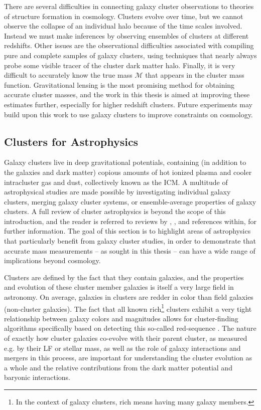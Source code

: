 There are several difficulties in connecting galaxy cluster observations to theories of structure formation in cosmology. Clusters evolve over time, but we cannot observe the collapse of an individual halo because of the time scales involved. Instead we must make inferences by observing ensembles of clusters at different redshifts. Other issues are the observational difficulties associated with compiling pure and complete samples of galaxy clusters, using techniques that nearly always probe some visible tracer of the cluster dark matter halo. Finally, it is very difficult to accurately know the true mass ${\mathscr M}$ that appears in the cluster mass function. Gravitational lensing is the most promising method for obtaining accurate cluster masses, and the work in this thesis is aimed at improving these estimates further, especially for higher redshift clusters. Future experiments may build upon this work to use galaxy clusters to improve constraints on cosmology.


\subsection{Clusters for Astrophysics}
\label{sec:ClusterAstro}

Galaxy clusters live in deep gravitational potentials, containing (in addition to the galaxies and dark matter) copious amounts of hot ionized plasma and cooler intracluster gas and dust, collectively known as the \ac{ICM}. A multitude of astrophysical studies are made possible by investigating individual galaxy clusters, merging galaxy cluster systems, or ensemble-average properties of galaxy clusters. A full review of cluster astrophysics is beyond the scope of this introduction, and the reader is referred to reviews by \citet{Kravtsov12}, \citet{Voit05}, and references within, for further information. The goal of this section is to highlight areas of astrophysics that particularly benefit from galaxy cluster studies, in order to demonstrate that accurate mass measurements -- as sought in this thesis -- can have a wide range of implications beyond cosmology.

Clusters are defined by the fact that they contain galaxies, and the properties and evolution of these cluster member galaxies is itself a very large field in astronomy. On average, galaxies in clusters are redder in color than field galaxies (non-cluster galaxies). The fact that all known rich\footnote{In the context of galaxy clusters, rich means having many galaxy members.} clusters exhibit a very tight relationship between galaxy colors and magnitudes allows for cluster-finding algorithms specifically based on detecting this so-called red-sequence \citep{Gladders00,Rykoff14}. The nature of exactly how cluster galaxies co-evolve with their parent cluster, as measured e.g. by their \ac{LF} or stellar mass, as well as the role of galaxy interactions and mergers in this process, are important for understanding the cluster evolution as a whole and the relative contributions from the dark matter potential and baryonic interactions. 

